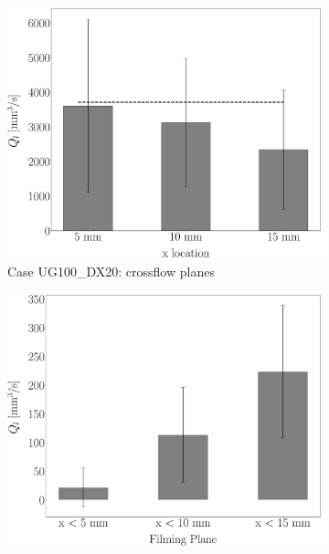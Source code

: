 \newpage

\begin{figure}[ht]
\centering
\begin{subfigure}[b]{0.45\textwidth}
	\centering
   \includegraphics[scale=0.10]{./part2_developments/figures_ch5_resolved_JICF/flow_rates_ibs/uG100_dx20_QL_isox_bar_plot.eps}
   \caption{Case UG100\_DX20: crossflow planes}
\end{subfigure}
\hfill
\begin{subfigure}[b]{0.45\textwidth}
	\centering
   \includegraphics[scale=0.10]{./part2_developments/figures_ch5_resolved_JICF/flow_rates_ibs/uG100_dx20_QL_filming_bar_plot.eps}

\end{subfigure}
\end{figure}
